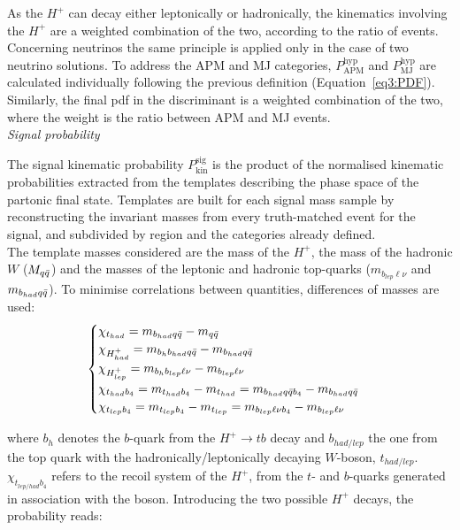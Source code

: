As the $H^+$ can decay either leptonically or hadronically, the kinematics involving the $H^+$ are a weighted combination of the two, according to the ratio of events. Concerning neutrinos the same principle is applied only in the case of two neutrino solutions. To address the APM and MJ categories, $P^{\text{hyp}}_{\text{APM}}$ and $P^{\text{hyp}}_{\text{MJ}}$ are calculated individually following the previous definition (Equation~\ref{eq3:PDF}). Similarly, the final pdf in the discriminant is a weighted combination of the two, where the weight is the ratio between APM and MJ events.\\


\textit{Signal probability}

The signal kinematic probability $P^{\text{sig}}_{\text{kin}}$ is the product of the normalised kinematic probabilities extracted from the templates describing the phase space of the partonic final state. Templates are built for each signal mass sample by reconstructing the invariant masses from every truth-matched event for the signal, and subdivided by region and the categories already defined.\\

The template masses considered are the mass of the $H^+$, the mass of the hadronic $W$ ($M_{q\Bar{q}}$) and the masses of the leptonic and hadronic top-quarks ($m_{b_{lep}\ell\nu}$ and $m_{b_{had}q\Bar{q}}$). To minimise correlations between quantities, differences of masses are used:
\begin{equation}
    \begin{cases} \chi_{t_{had}}=m_{b_{had}q\Bar{q}}-m_{q\Bar{q}} \\ 
    \chi_{H^+_{had}}=m_{b_hb_{had}q\Bar{q}}-m_{b_{had}q\Bar{q}} \\
    \chi_{H^+_{lep}}=m_{b_hb_{lep}\ell\nu}-m_{b_{lep}\ell\nu}\\
    \chi_{t_{had}b_4}=m_{t_{had}b_4}-m_{t_{had}}=m_{b_{had}q\bar{q}b_4}-m_{b_{had}q\bar{q}}\\
    \chi_{t_{lep}b_4}=m_{t_{lep}b_4}-m_{t_{lep}}=m_{b_{lep}\ell\nu b_4}-m_{b_{lep}\ell\nu}\\
    \end{cases} 
\end{equation}

where $b_h$ denotes the $b$-quark from the $H^+\to tb$ decay and $b_{had/lep}$ the one from the top quark with the hadronically/leptonically decaying $W$-boson, $t_{had/lep}$. $\chi_{t_{lep/had}b_4}$ refers to the recoil system of the $H^+$, from the $t$- and $b$-quarks generated in association with the boson.
Introducing the two possible $H^+$ decays, the probability reads:

